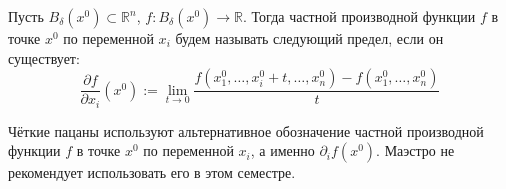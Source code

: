 \documentclass[11pt]{article}
\begin{document}
\begin{definition}
    Пусть $B_{\delta}\left(x^0\right) \subset \mathbb{R}^n$, $f \colon B_{\delta}\left(x^0\right) \to \mathbb{R}$. Тогда 
    частной производной функции $f$ в точке $x^0$ по переменной $x_i$ будем называть следующий предел, если он существует:
    \[\frac{\partial f}{\partial x_i} \left(x^0\right) := \lim_{t \to 0} \frac{f\left(x_1^0, \ldots, x_i^0 + t, \ldots, x_n^0\right) - f\left(x_1^0, \ldots, x_n^0\right)}{t}\]
\end{definition}

\begin{remark}
    Чёткие пацаны используют альтернативное обозначение частной производной функции 
    $f$ в точке $x^0$ по переменной $x_i$, а именно
    $\partial_i f\left(x^0\right)$. Маэстро не рекомендует использовать его в этом семестре.
\end{remark}
\end{document}
